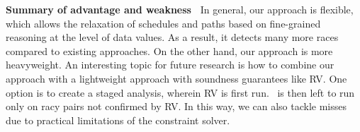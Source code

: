 {\bf Summary of advantage and weakness\ } In general, our approach is flexible, which allows the relaxation of schedules and paths based on  fine-grained reasoning at the level of data values. As a result, it detects many more races compared to existing approaches. On the other hand, our approach is more heavyweight. An interesting topic for future research is how  to combine our approach with a lightweight approach with soundness guarantees like {\sf RV}. One option is to create a staged analysis, wherein {\sf RV} is first run. \tool\ is then left to run only on racy pairs not confirmed by {\sf RV}.
In this way, we can also tackle misses due to practical limitations of the constraint solver.
 














